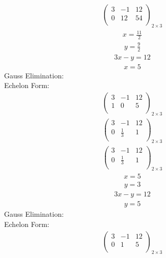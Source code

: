 \documentclass{article}
\begin{document}
\begin{align*}
\left(
\begin{array}{cc|c}
3 & -1 & 12\\
0 & 12 & 54\\
\end{array}
\right)_{2\times 3}
\end{align*}
\begin{align*}
x=\frac{11}{2}\end{align*}
\begin{align*}
y=\frac{9}{2}\end{align*}
\begin{align*}
3x - y=12\end{align*}
\begin{align*}
x=5\end{align*}
Gauss Elimination:\\
Echelon Form:\\
\begin{align*}
\left(
\begin{array}{cc|c}
3 & -1 & 12\\
1 & 0 & 5\\
\end{array}
\right)_{2\times 3}
\end{align*}
\begin{align*}
\left(
\begin{array}{cc|c}
3 & -1 & 12\\
0 & \frac{1}{3} & 1\\
\end{array}
\right)_{2\times 3}
\end{align*}
\begin{align*}
\left(
\begin{array}{cc|c}
3 & -1 & 12\\
0 & \frac{1}{3} & 1\\
\end{array}
\right)_{2\times 3}
\end{align*}
\begin{align*}
x=5\end{align*}
\begin{align*}
y=3\end{align*}
\begin{align*}
3x - y=12\end{align*}
\begin{align*}
y=5\end{align*}
Gauss Elimination:\\
Echelon Form:\\
\begin{align*}
\left(
\begin{array}{cc|c}
3 & -1 & 12\\
0 & 1 & 5\\
\end{array}
\right)_{2\times 3}
\end{align*}
\end{document}
